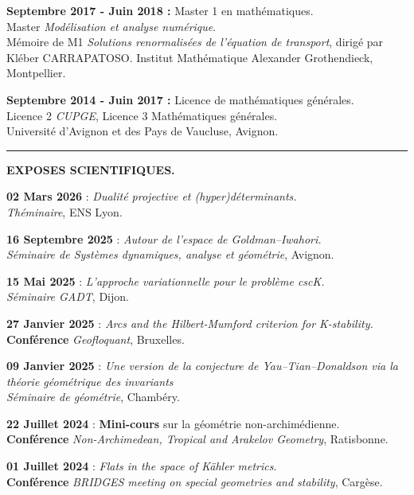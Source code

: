 \documentclass{article}
\theoremstyle{definition}
\theoremstyle{definition}
\theoremstyle{definition}
\newcommand\bsni{\bigskip\noindent}
\begin{document}
\bsni \textbf{Septembre 2017 - Juin 2018 :} Master 1 en mathématiques.\\
Master \textit{Modélisation et analyse numérique}.\\
Mémoire de M1 \textit{Solutions renormalisées de l'équation de transport}, dirigé par Kléber CARRAPATOSO.
Institut Mathématique Alexander Grothendieck, Montpellier.


\bsni \textbf{Septembre 2014 - Juin 2017 :} Licence de mathématiques générales.\\
Licence 2 \textit{CUPGE}, Licence 3 Mathématiques générales.\\
Université d'Avignon et des Pays de Vaucluse, Avignon.

\fi

\par\noindent\rule{\textwidth}{0.4pt}
\textbf{EXPOSES SCIENTIFIQUES.}


\bsni \textbf{02 Mars 2026} : \textit{Dualité projective et (hyper)déterminants.}\\
\textit{Théminaire}, ENS Lyon.

\bsni \textbf{16 Septembre 2025} : \textit{Autour de l’espace de Goldman–Iwahori.}\\
\textit{Séminaire de Systèmes dynamiques, analyse et géométrie}, Avignon.

\bsni \textbf{15 Mai 2025} : \textit{L’approche variationnelle pour le problème cscK.}\\
\textit{Séminaire GADT}, Dijon.

\bsni \textbf{27 Janvier 2025} : \textit{Arcs and the Hilbert-Mumford criterion for K-stability.}\\
\textbf{Conférence} \textit{Geofloquant}, Bruxelles.

\bsni \textbf{09 Janvier 2025} : \textit{Une version de la conjecture de Yau--Tian--Donaldson via la théorie géométrique des invariants}\\
\textit{Séminaire de géométrie}, Chambéry.

\bsni \textbf{22 Juillet 2024} : \textbf{Mini-cours} sur la géométrie non-archimédienne.\\
\textbf{Conférence} \textit{Non-Archimedean, Tropical and Arakelov Geometry}, Ratisbonne.

\bsni \textbf{01 Juillet 2024} : \textit{Flats in the space of Kähler metrics}.\\
\textbf{Conférence} \textit{BRIDGES meeting on special geometries and stability}, Cargèse.
\end{document}
